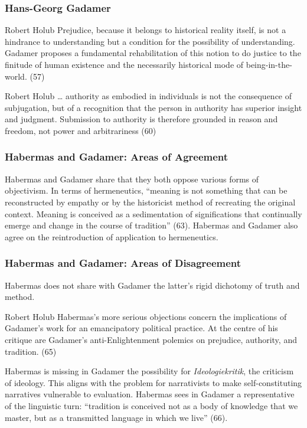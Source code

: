 \documentclass[xcolor=dvipsnames]{beamer}
\begin{document}
\begin{frame}
  \frametitle{Hans-Georg Gadamer}
  \begin{block}{Robert Holub}
    Prejudice, because it belongs to historical reality itself, is not
    a hindrance to understanding but a condition for the possibility
    of understanding. Gadamer proposes a fundamental rehabilitation of
    this notion to do justice to the finitude of human existence and
    the necessarily historical mode of being-in-the-world. (57)
  \end{block}
  \begin{block}{Robert Holub}
    {\ldots} authority as embodied in individuals is not the
    consequence of subjugation, but of a recognition that the person
    in authority has superior insight and judgment. Submission to
    authority is therefore grounded in reason and freedom, not power
    and arbitrariness (60)
  \end{block}
\end{frame}

\begin{frame}
  \frametitle{Habermas and Gadamer: Areas of Agreement}
  Habermas and Gadamer share that they both oppose various forms of
  objectivism. In terms of hermeneutics, ``meaning is not something
  that can be reconstructed by empathy or by the historicist method of
  recreating the original context. Meaning is conceived as a
  sedimentation of significations that continually emerge and change
  in the course of tradition'' (63). Habermas and Gadamer also agree
  on the reintroduction of application to hermeneutics.
\end{frame}

\begin{frame}
  \frametitle{Habermas and Gadamer: Areas of Disagreement}
Habermas does not share with Gadamer the latter's rigid dichotomy of
truth and method.
\begin{block}{Robert Holub}
  Habermas's more serious objections concern the implications of
  Gadamer's work for an emancipatory political practice. At the centre
  of his critique are Gadamer's anti-Enlightenment polemics on
  prejudice, authority, and tradition. (65)
\end{block}
Habermas is missing in Gadamer the possibility for
\emph{Ideologiekritik}, the criticism of ideology. This aligns with
the problem for narrativists to make self-constituting narratives
vulnerable to evaluation. Habermas sees in Gadamer a representative of
the \alert{linguistic turn}: ``tradition is conceived not as a body of
knowledge that we master, but as a transmitted language in which we
live'' (66).
\end{frame}
\end{document}
